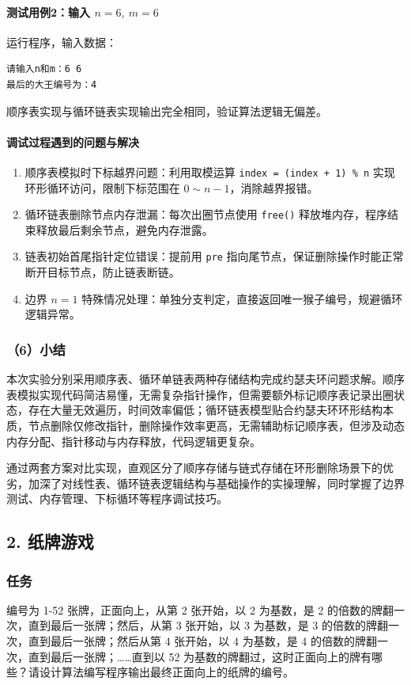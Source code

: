 \documentclass{ctexart}
\begin{document}
\paragraph{测试用例2：输入 $n=6,\ m=6$}
运行程序，输入数据：
\begin{verbatim}
请输入n和m：6 6
最后的大王编号为：4
\end{verbatim}
顺序表实现与循环链表实现输出完全相同，验证算法逻辑无偏差。

\paragraph{调试过程遇到的问题与解决}
\begin{enumerate}
    \item 顺序表模拟时下标越界问题：利用取模运算 \texttt{index = (index + 1) \% n} 实现环形循环访问，限制下标范围在 $0 \sim n-1$，消除越界报错。
    \item 循环链表删除节点内存泄漏：每次出圈节点使用 \texttt{free()} 释放堆内存，程序结束释放最后剩余节点，避免内存泄露。
    \item 链表初始首尾指针定位错误：提前用 \texttt{pre} 指向尾节点，保证删除操作时能正常断开目标节点，防止链表断链。
    \item 边界 $n=1$ 特殊情况处理：单独分支判定，直接返回唯一猴子编号，规避循环逻辑异常。
\end{enumerate}

\subsubsection{（6）小结}
本次实验分别采用顺序表、循环单链表两种存储结构完成约瑟夫环问题求解。顺序表模拟实现代码简洁易懂，无需复杂指针操作，但需要额外标记顺序表记录出圈状态，存在大量无效遍历，时间效率偏低；循环链表模型贴合约瑟夫环环形结构本质，节点删除仅修改指针，删除操作效率更高，无需辅助标记顺序表，但涉及动态内存分配、指针移动与内存释放，代码逻辑更复杂。

通过两套方案对比实现，直观区分了顺序存储与链式存储在环形删除场景下的优劣，加深了对线性表、循环链表逻辑结构与基础操作的实操理解，同时掌握了边界测试、内存管理、下标循环等程序调试技巧。


\subsection{2. 纸牌游戏}
\subsubsection{任务}
编号为 1-52 张牌，正面向上，从第 2 张开始，以 2 为基数，是 2 的倍数的牌翻一次，直到最后一张牌；然后，从第 3 张开始，以 3 为基数，是 3 的倍数的牌翻一次，直到最后一张牌；然后从第 4 张开始，以 4 为基数，是 4 的倍数的牌翻一次，直到最后一张牌；……直到以 52 为基数的牌翻过，这时正面向上的牌有哪些？请设计算法编写程序输出最终正面向上的纸牌的编号。
\end{document}
